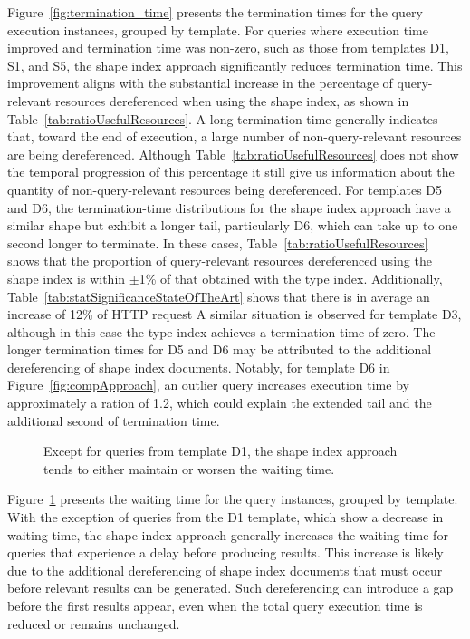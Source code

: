 Figure~\ref{fig:termination_time} presents the termination times for the query execution instances, grouped by template. 
For queries where execution time improved and termination time was non-zero, such as those from templates D1, S1, and S5, the shape index approach significantly reduces termination time. 
This improvement aligns with the substantial increase in the percentage of query-relevant resources dereferenced when using the shape index, as shown in Table~\ref{tab:ratioUsefulResources}.
A long termination time generally indicates that, toward the end of execution, a large number of non-query-relevant resources are being dereferenced. 
Although Table~\ref{tab:ratioUsefulResources} does not show the temporal progression of this percentage it still give us information about the quantity of non-query-relevant resources being dereferenced.
For templates D5 and D6, the termination-time distributions for the shape index approach have a similar shape but exhibit a longer tail, particularly D6, which can take up to one second longer to terminate. 
In these cases, Table~\ref{tab:ratioUsefulResources} shows that the proportion of query-relevant resources dereferenced using the shape index is within $\pm$1\% of that obtained with the type index.
Additionally, Table~\ref{tab:statSignificanceStateOfTheArt} shows that there is in average an increase of 12\% of HTTP request
A similar situation is observed for template D3, although in this case the type index achieves a termination time of zero. 
The longer termination times for D5 and D6 may be attributed to the additional dereferencing of shape index documents. 
Notably, for template D6 in Figure~\ref{fig:compApproach}, an outlier query increases execution time by approximately a ration of 1.2, which could explain the extended tail and the additional second of termination time.


\begin{figure}
    \centering
    
    \caption{Except for queries from template D1, the shape index approach tends to either maintain or worsen the waiting time.}
    \label{fig:waiting_time}
\end{figure}

Figure~\ref{fig:waiting_time} presents the waiting time for the query instances, grouped by template. 
With the exception of queries from the D1 template, which show a decrease in waiting time, the shape index approach generally increases the waiting time for queries that experience a delay before producing results. 
This increase is likely due to the additional dereferencing of shape index documents that must occur before relevant results can be generated. 
Such dereferencing can introduce a gap before the first results appear, even when the total query execution time is reduced or remains unchanged.


